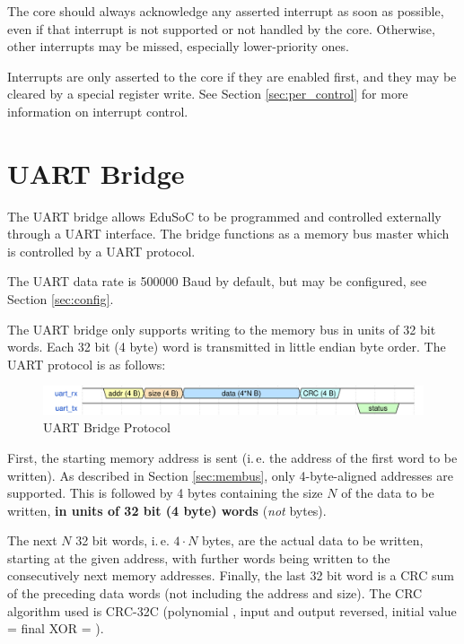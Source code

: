 The core should always acknowledge any asserted interrupt as soon as possible, even if that interrupt is not supported or not handled by the core. Otherwise, other interrupts may be missed, especially lower-priority ones.

Interrupts are only asserted to the core if they are enabled first, and they may be cleared by a special register write. See Section \ref{sec:per_control} for more information on interrupt control.

\newpage
\section{UART Bridge}\label{sec:uart}
The UART bridge allows EduSoC to be programmed and controlled externally through a UART interface.
The bridge functions as a memory bus master which is controlled by a UART protocol.

The UART data rate is 500000 Baud by default, but may be configured, see Section \ref{sec:config}.

The UART bridge only supports writing to the memory bus in units of 32 bit words. Each 32 bit (4 byte) word is transmitted in little endian byte order.
The UART protocol is as follows:\\
\begin{figure}[H]
    \centering
    \includegraphics[width=\textwidth]{graphics/EduSoC_UART_Protocol.svg}
    \vspace{-1em}
    \caption{UART Bridge Protocol}
    \label{fig:uart_protocol}
\end{figure}
First, the starting memory address is sent (i.\,e. the address of the first word to be written). As described in Section \ref{sec:membus}, only 4-byte-aligned addresses are supported. This is followed by 4 bytes containing the size $N$ of the data to be written, \textbf{in units of 32 bit (4 byte) words} (\textit{not} bytes).

The next $N$ 32 bit words, i.\,e. $4 \cdot N$ bytes, are the actual data to be written, starting at the given address, with further words being written to the consecutively next memory addresses. Finally, the last 32 bit word is a CRC sum of the preceding data words (not including the address and size). The CRC algorithm used is CRC-32C (polynomial , input and output reversed, initial value = final XOR = ).

